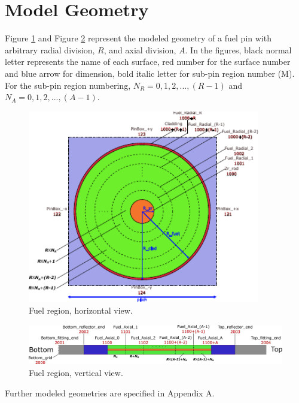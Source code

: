 \documentclass{UWNR_modeling}
\begin{document}
\section{Model Geometry}\label{section:geometry}
Figure \ref{fig:fuel_xy} and Figure \ref{fig:fuel_yz} represent the modeled geometry of a fuel pin with arbitrary radial division, $R$, and axial division, $A$. In the figures, black normal letter represents the name of each surface, red number for the surface number and blue arrow for dimension, bold italic letter for sub-pin region number (M). For the sub-pin region numbering, $N_{R} = 0, 1, 2, ..., (R-1)$ and $N_{A} = 0, 1, 2, ..., (A-1)$.

\begin{figure}[H]
  \centering
  \includegraphics[width=4in]{fuel_xy.pdf}
  \caption{Fuel region, horizontal view.}
  \label{fig:fuel_xy}
\end{figure}

\begin{figure}[H]
  \centering
  \includegraphics[width=7in]{fuel_yz.pdf}
  \caption{Fuel region, vertical view.}
  \label{fig:fuel_yz}
\end{figure}

Further modeled geometries are specified in Appendix A.
\newpage
\end{document}
